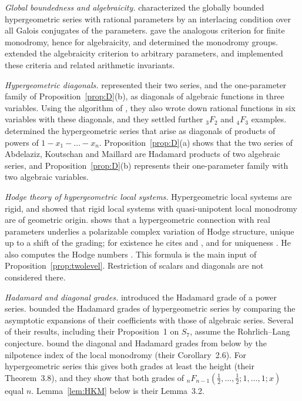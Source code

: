 \documentclass[11pt]{amsart}
\theoremstyle{definition}
\theoremstyle{remark}
\numberwithin{equation}{section}
\begin{document}
\emph{Global boundedness and algebraicity.} \citet{Christol1987} characterized the globally bounded hypergeometric series with rational parameters by an interlacing condition over all Galois conjugates of the parameters. \citet{BeukersHeckman1989} gave the analogous criterion for finite monodromy, hence for algebraicity, and determined the monodromy groups. \citet{FurnsinnYurkevich2024} extended the algebraicity criterion to arbitrary parameters, and \citet{CarusoFurnsinn2026a,CarusoFurnsinn2026b} implemented these criteria and related arithmetic invariants.

\emph{Hypergeometric diagonals.} \citet{AbdelazizKoutschanMaillard2020} represented their two series, and the one-parameter family of Proposition~\ref{prop:D}(b), as diagonals of algebraic functions in three variables. Using the algorithm of \citet{DenefLipshitz1987}, they also wrote down rational functions in six variables with these diagonals, and they settled further ${}_3F_2$ and ${}_4F_3$ examples. \citet{BostanYurkevich2022} determined the hypergeometric series that arise as diagonals of products of powers of $1-x_1-\dots-x_n$. Proposition~\ref{prop:D}(a) shows that the two series of Abdelaziz, Koutschan and Maillard are Hadamard products of two algebraic series, and Proposition~\ref{prop:D}(b) represents their one-parameter family with two algebraic variables.

\emph{Hodge theory of hypergeometric local systems.} Hypergeometric local systems are rigid, and \citet{Katz1996} showed that rigid local systems with quasi-unipotent local monodromy are of geometric origin. \citet[Proposition~2.6]{Fedorov2018} shows that a hypergeometric connection with real parameters underlies a polarizable complex variation of Hodge structure, unique up to a shift of the grading; for existence he cites \citet[Corollary~8.1]{Simpson1990} and \citet[Theorem~2.4.1]{DettweilerSabbah2013}, and for uniqueness \citet[Proposition~1.13(i)]{Deligne1987}. He also computes the Hodge numbers \citep[Theorem~1]{Fedorov2018}. This formula is the main input of Proposition~\ref{prop:twolevel}. Restriction of scalars and diagonals are not considered there.

\emph{Hadamard and diagonal grades.} \citet{AlloucheMendesFrance2011} introduced the Hadamard grade of a power series. \citet{RivoalRoques2014} bounded the Hadamard grades of hypergeometric series by comparing the asymptotic expansions of their coefficients with those of algebraic series. Several of their results, including their Proposition~1 on $S_7$, assume the Rohrlich--Lang conjecture. \citet{HarderKramerMiller2025} bound the diagonal and Hadamard grades from below by the nilpotence index of the local monodromy (their Corollary~2.6). For hypergeometric series this gives both grades at least the height (their Theorem~3.8), and they show that both grades of ${}_nF_{n-1}(\frac12,\dots,\frac12;1,\dots,1;x)$ equal $n$. Lemma~\ref{lem:HKM} below is their Lemma~3.2.
\end{document}
